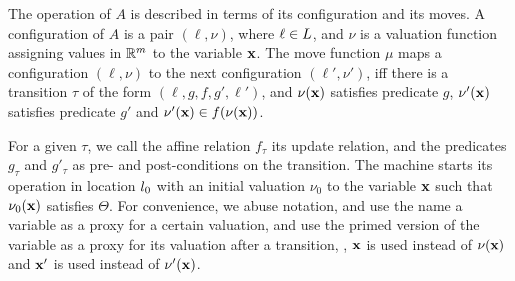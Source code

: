 The operation of $A$ is described in terms of its configuration and
its moves. A configuration of $A$ is a pair $(\ell, \nu)$, where $\ell
\in L$, and $\nu$ is a valuation function assigning values in
$\mathbb{R}^m$ to the variable $\mathbf{x}$.  The move function $\mu$ maps a
configuration $(\ell,\nu)$ to the next configuration $(\ell',\nu')$,
iff there is a transition $\tau$ of the form $(\ell,g,f,g',\ell')$,
and $\nu(\mathbf{x})$ satisfies predicate $g$, $\nu'(\mathbf{x})$ satisfies
predicate $g'$ and $\nu'(\mathbf{x}) \in f(\nu(\mathbf{x}))$.

For a given $\tau$, we call the affine relation $f_\tau$ its update
relation, and the predicates $g_\tau$ and $g'_\tau$ as pre- and
post-conditions on the transition. The machine starts its operation in
location $l_0$ with an initial valuation $\nu_0$ to the variable
$\mathbf{x}$ such that $\nu_0(\mathbf{x})$ satisfies $\Theta$. For convenience, we
abuse notation, and use the name a variable as a proxy for a certain
valuation, and use the primed version of the variable as a proxy for
its valuation after a transition, \ie, $\mathbf{x}$ is used instead of
$\nu(\mathbf{x})$ and $\mathbf{x}'$ is used instead of $\nu'(\mathbf{x})$.





